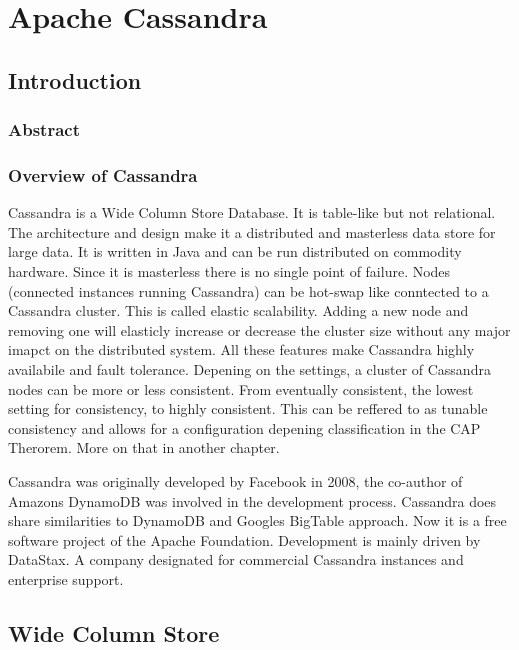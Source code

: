 \chapter{Apache Cassandra}

\section{Introduction}
\subsection{Abstract}
\subsection{Overview of Cassandra}
Cassandra is a Wide Column Store Database. It is table-like but not relational.
The architecture and design make it a distributed and masterless data store for large data.
It is written in Java and can be run distributed on commodity hardware.
Since it is masterless there is no single point of failure.
Nodes (connected instances running Cassandra) can be hot-swap like conntected to a Cassandra cluster.
This is called elastic scalability. Adding a new node and removing one will elasticly increase or decrease
the cluster size without any major imapct on the distributed system.
All these features make Cassandra highly availabile and fault tolerance.
Depening on the settings, a cluster of Cassandra nodes can be more or less consistent.
From eventually consistent, the lowest setting for consistency, to highly consistent.
This can be reffered to as tunable consistency and allows for a configuration depening classification in 
the CAP Therorem. More on that in another chapter.

Cassandra was originally developed by Facebook in 2008, the co-author of Amazons DynamoDB was involved
in the development process. Cassandra does share similarities to DynamoDB and Googles BigTable approach.
Now it is a free software project of the Apache Foundation. Development is mainly driven by DataStax.
A company designated for commercial Cassandra instances and enterprise support.


\section{Wide Column Store}

